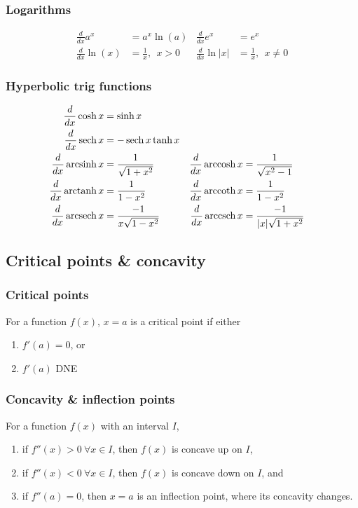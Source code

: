 \documentclass[main.tex]{subfiles}
\begin{document}
	\subsubsection*{Logarithms}
	\begin{align*}
		\frac{d}{dx} a^x &= a^x \ln{(a)} & \frac{d}{dx} e^x &= e^x \\
		\frac{d}{dx} \ln{(x)} &= \frac{1}{x}, \ \ x > 0 & \frac{d}{dx} \ln{|x|} &= \frac{1}{x}, \ \ x \neq 0
	\end{align*}

	\subsubsection*{Hyperbolic trig functions}
	\begin{align*}
		\frac{d}{dx} \cosh{x} &= \sinh{x} \\
		\frac{d}{dx} \operatorname{sech}{x} &= -\operatorname{sech}{x} \tanh{x} \\
		\frac{d}{dx} \operatorname{arcsinh}{x} &= \frac{1}{\sqrt{1 + x^2}} & \frac{d}{dx} \operatorname{arccosh}{x} &= \frac{1}{\sqrt{x^2 - 1}} \\
		\frac{d}{dx} \operatorname{arctanh}{x} &= \frac{1}{1 - x^2} & \frac{d}{dx} \operatorname{arccoth}{x} &= \frac{1}{1 - x^2} \\
		\frac{d}{dx} \operatorname{arcsech}{x} &= \frac{-1}{x \sqrt{1 - x^2}} & \frac{d}{dx} \operatorname{arccsch}{x} &= \frac{-1}{|x| \sqrt{1 + x^2}}
	\end{align*}

	\subsection*{Critical points \& concavity}
	\subsubsection*{Critical points}
	For a function \(f(x)\), \(x = a\) is a critical point if either
	\begin{enumerate}
		\item \(f'(a) = 0\), or
		\item \(f'(a)\) DNE
	\end{enumerate}

	\subsubsection*{Concavity \& inflection points}
	For a function \(f(x)\) with an interval \(I\),
	\begin{enumerate}
		\item if \(f''(x) > 0 \ \forall x \in I\), then \(f(x)\) is concave up on \(I\),
		\item if \(f''(x) < 0 \ \forall x \in I\), then \(f(x)\) is concave down on \(I\), and
		\item if \(f''(a) = 0\), then \(x = a\) is an inflection point, where its concavity changes.
	\end{enumerate}
\end{document}
